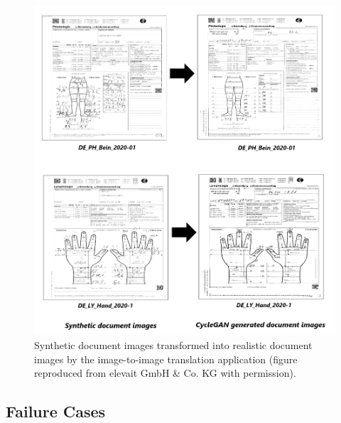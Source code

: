 \begin{figure}[H]
        \begin{center}
	    \includegraphics[scale=0.30]{images/Evaluation/Qualitative_Results_1.png}
	    \caption[Synthetic document images transformed into realistic document images by the image-to-image translation application.]{Synthetic document images transformed into realistic document images by the image-to-image translation application (figure reproduced from elevait GmbH \& Co. KG with permission).}
	    \label{fig:QualitativeResults1}
	    \end{center}
\end{figure}








\subsection{Failure Cases}\label{FailureCases}

